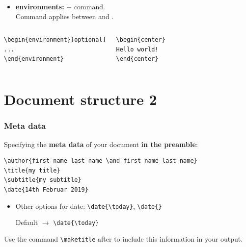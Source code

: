 \begin{frame}[fragile]
\pause 

\begin{itemize}
	\item \textbf{environments:}  $+$  command. \\
	Command applies between  and .
\end{itemize}

\vspace{-.5cm}

\begin{columns}
	
\begin{lstlisting}
\begin{environment}[optional]
...
\end{environment}

\end{lstlisting}


\begin{lstlisting}
\begin{center}
Hello world!
\end{center}
\end{lstlisting}

\end{columns}

\end{frame}


\section{Document structure 2}

\begin{frame}[fragile]
\frametitle{Meta data}

Specifying the \textbf{meta data} of your document \textbf{in the preamble}: 

\begin{lstlisting}
\author{first name last name \and first name last name}
\title{my title}
\subtitle{my subtitle}
\date{14th Februar 2019}
\end{lstlisting}

\begin{itemize}
	\item Other options for date: \lstinline|\date{\today}|, \lstinline|\date{}|
	
	Default $\rightarrow$ \lstinline|\date{\today}|
\end{itemize}

Use the command \lstinline|\maketitle| after \lstinline|| to include this information in your output.
\end{frame}


